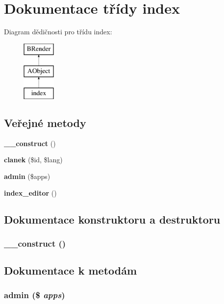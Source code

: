 \section{Dokumentace třídy index}
\label{d0/d3a/classindex}
Diagram dědičnosti pro třídu index:\begin{figure}[H]
\begin{center}
\leavevmode
\includegraphics[height=3cm]{d0/d3a/classindex}
\end{center}
\end{figure}
\subsection*{Veřejné metody}
\begin{DoxyCompactItemize}
\item 
{\bf \_\-\_\-construct} ()
\item 
{\bf clanek} (\$id, \$lang)
\item 
{\bf admin} (\$apps)
\item 
{\bf index\_\-editor} ()
\end{DoxyCompactItemize}


\subsection{Dokumentace konstruktoru a destruktoru}
\subsubsection[{\_\-\_\-construct}]{\setlength{\rightskip}{0pt plus 5cm}\_\-\_\-construct ()}\label{d0/d3a/classindex_a095c5d389db211932136b53f25f39685}


\subsection{Dokumentace k metodám}
\subsubsection[{admin}]{\setlength{\rightskip}{0pt plus 5cm}admin (\$ {\em apps})}\label{d0/d3a/classindex_a9b4e261c39cdf31143facc36363e209a}
